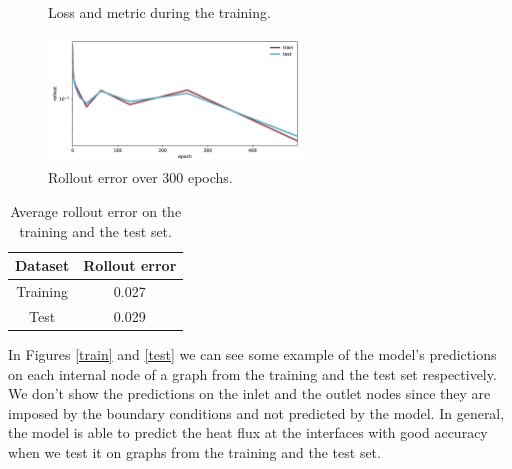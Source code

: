 \documentclass[11pt,a4paper]{article}
\begin{document}
\begin{figure}[H]
    \centering
    \caption{Loss and metric during the training.}
    \label{loss}
\end{figure}

\begin{figure}[H]
    \centering
    \includegraphics[width=0.6\textwidth]{Images/rollout.jpg}
    \caption{Rollout error over 300 epochs.}
    \label{rollout_plot}
\end{figure}

\begin{table}[H]
    \centering
    \begin{tabular}{|c|c|}
        \hline
        \textbf{Dataset} & \textbf{Rollout error} \\
        \hline
        Training & 0.027 \\
        Test & 0.029 \\
        \hline
    \end{tabular}
    \caption{Average rollout error on the training and the test set.}
    \label{errors}
\end{table}

In Figures \ref{train} and \ref{test} we can see some example of the model's predictions on each internal node of a graph from the training and the test set respectively. We don't show the predictions on the inlet and the outlet nodes since they are imposed by the boundary conditions and not predicted by the model.
In general, the model is able to predict the heat flux at the interfaces with good accuracy when we test it on graphs from the training and the test set. 
\end{document}
